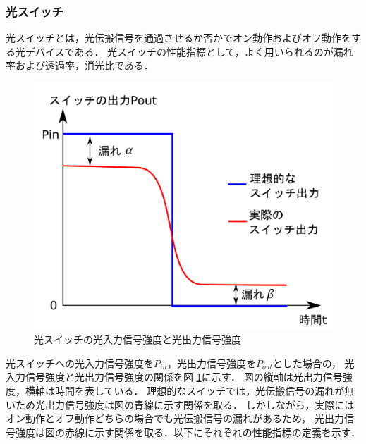 \subsubsection{光スイッチ}
光スイッチとは，光伝搬信号を通過させるか否かでオン動作およびオフ動作をする光デバイスである．
光スイッチの性能指標として，よく用いられるのが漏れ率および透過率，消光比である．
\begin{figure}[t!]
\begin{center}
\includegraphics[keepaspectratio,scale=0.35]{fig/3/swichout.pdf}
\caption{光スイッチの光入力信号強度と光出力信号強度}
\label{fig:swichout}
\end{center}
\end{figure}
光スイッチへの光入力信号強度を$P_{in}$，光出力信号強度を$P_{out}$とした場合の，
光入力信号強度と光出力信号強度の関係を図 \ref{fig:swichout}に示す．
図の縦軸は光出力信号強度，横軸は時間を表している．
理想的なスイッチでは，光伝搬信号の漏れが無いため光出力信号強度は図の青線に示す関係を取る．
しかしながら，実際にはオン動作とオフ動作どちらの場合でも光伝搬信号の漏れがあるため，
光出力信号強度は図の赤線に示す関係を取る．以下にそれぞれの性能指標の定義を示す．
